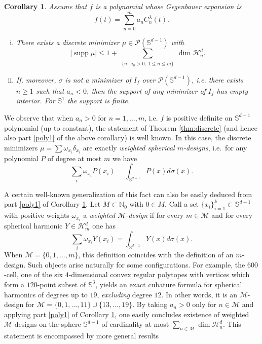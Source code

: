 \documentclass[11pt, leqno]{amsart}
\def\dim{\operatorname{dim}}
\def\S{\mathbb S}
\def\supp{\operatorname{supp}}
\newtheorem{corollary}[theorem]{Corollary}
\theoremstyle{definition}
\numberwithin{equation}{section}
\begin{document}
\begin{corollary}\label{cor:poly}
Assume that $f$ is a polynomial whose Gegenbauer expansion is 
\begin{equation}
f(t) = \sum_{n=0}^m a_n C_n^\lambda (t). 
\end{equation}
\begin{enumerate}[(i)]
\item\label{poly1} There exists a discrete minimizer $\mu \in \mathcal P (\S^{d-1})$ with  
\begin{equation*}\label{eq:wd}
 \big| \supp \mu \big| \le 1 + \sum_{\substack{\{n:\ a_n >0,\ 1\leq n\leq m \} }}  \dim \mathcal H_n^d.  
 \end{equation*}
\item\label{poly2} If, moreover, $\sigma$ is not a minimizer of $I_f$ over $\mathcal P (\S^{d-1})$, i.e. there exists $n\ge 1 $ such that $a_n <0$, then the support of any minimizer of $I_f$ has empty interior.  For $\S^1$ the support is finite.
\end{enumerate}
\end{corollary}


We observe that when $a_n > 0$  for $n=1,\dots,m$, i.e. $f$ is positive definite on $\S^{d-1}$  polynomial (up to constant), the statement of Theorem \ref{thm:discrete} (and hence also part \eqref{poly1} of the above corollary) is well known. In this case, the discrete minimizers $\mu = \sum \omega_{x_i} \delta_{x_i}$ are exactly {\em{weighted spherical $m$-designs}}, i.e.\ for any polynomial $P$ of degree at most $m$ we have  $$ \sum_{i} \omega_{x_i} P(x_i)  = \int_{\S^{d-1}} P(x)  d\sigma (x). $$  


A certain well-known generalization of this fact can also be easily deduced from part \eqref{poly1} of Corollary \ref{cor:poly}. Let $M \subset \mathbb N_0$ with $0\in M$.  Call a set $\{x_i\}_{i=1}^k\subset \S^{d-1}$ with positive weights $\omega_{x_i}$ a {\it{weighted $\mathcal{M}$-design}} if for every $m\in \mathcal{M}$ and for every spherical harmonic $Y \in \mathcal H_m^d$ one has $$ \sum_{i} \omega_{x_i} Y(x_i)  = \int_{\S^{d-1}} Y(x)  d\sigma (x). $$ When $\mathcal{M}=\{0,1,\dots,m\}$, this definition coincides with the definition of an $m$-design. Such objects arise naturally for some configurations. For example, the $600$-cell, one of the six $4$-dimensional convex regular polytopes with vertices which form a $120$-point subset of $\S^3$, yields an exact cubature formula for spherical harmonics of degrees up to $19$, {\it{excluding}} degree $12$. In other words, it is an $\mathcal{M}$-design for $\mathcal{M} = \{ 0,1,\dots, 11\} \cup\{13, \dots, 19\}$. By taking $a_n >0$ only for $n\in \mathcal{M}$ and applying part \eqref{poly1} of Corollary \ref{cor:poly}, one easily concludes existence of weighted $\mathcal{M}$-designs on the sphere $\mathbb S^{d-1}$ of cardinality at most
$\sum_{n\in \mathcal{M}} \dim \mathcal H_n^d$. This statement is encompassed by more general results \cite{tchaka,rogo}
\end{document}
